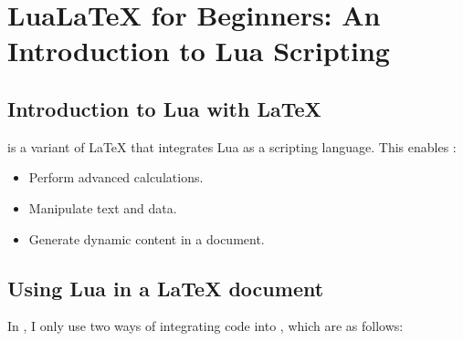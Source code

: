 \newpage
\section{LuaLaTeX for Beginners: An Introduction to Lua Scripting}

\subsection{Introduction to Lua with LaTeX}

\tkzEngine{\LUALATEX} is a variant of LaTeX that integrates Lua as a scripting language. This enables :

\begin{itemize}
  \item Perform advanced calculations.
  \item Manipulate text and data.
  \item Generate dynamic content in a document.
\end{itemize}

\subsection{Using Lua in a LaTeX document}

In , I only use two ways of integrating code into , which are as follows:

